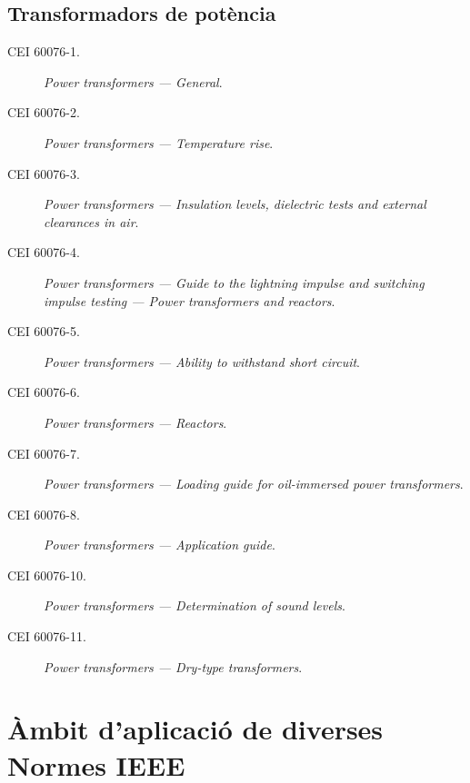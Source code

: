 \subsection*{Transformadors de potència}
\begin{description}
    \item [\hspace{5mm}CEI 60076-1.] \textit{Power transformers --- General}.
    \item [\hspace{5mm}CEI 60076-2.] \textit{Power transformers --- Temperature rise}.
    \item [\hspace{5mm}CEI 60076-3.] \textit{Power transformers --- Insulation levels, dielectric tests and external clearances in air}.
    \item [\hspace{5mm}CEI 60076-4.] \textit{Power transformers --- Guide to the lightning impulse and switching impulse testing --- Power transformers and reactors}.
    \item [\hspace{5mm}CEI 60076-5.] \textit{Power transformers --- Ability to withstand short circuit}.
    \item [\hspace{5mm}CEI 60076-6.] \textit{Power transformers --- Reactors}.
    \item [\hspace{5mm}CEI 60076-7.] \textit{Power transformers --- Loading guide for oil-immersed power transformers}.
    \item [\hspace{5mm}CEI 60076-8.] \textit{Power transformers --- Application guide}.
    \item [\hspace{5mm}CEI 60076-10.] \textit{Power transformers --- Determination of sound levels}.
    \item [\hspace{5mm}CEI 60076-11.] \textit{Power transformers --- Dry-type transformers}.
\end{description}


\section{Àmbit d'aplicació de diverses Normes IEEE}\label{sec:normes_IEEE}

